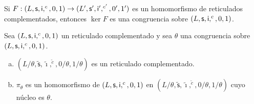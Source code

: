   \begin{lemma}
    \PN Si $F: (L, \mathsf{s}, \mathsf{i}, ^{c}, 0, 1) \rightarrow (L^{\prime}, \mathsf{s}^{\prime}, \mathsf{i}^{\prime}, ^{c^{\prime}}, 0^{\prime},
    1^{\prime})$ es un homomorfismo de reticulados complementados, entonces $\ker F$ es una congruencia sobre $(L, \mathsf{s},
    \mathsf{i}, ^{c}, 0, 1)$.
  \end{lemma}

  \begin{lemma}
    \PN Sea $(L, \mathsf{s}, \mathsf{i}, ^{c}, 0, 1)$ un reticulado complementado y sea $\theta$ una congruencia sobre $(L, \mathsf{s}, \mathsf{i},
    ^{c}, 0, 1)$.
    \begin{enumerate}[a)]
      \item $(L/\theta, \mathsf{\tilde{s}}, \mathsf{\tilde{\imath}}, ^{\tilde{c}}, 0/\theta, 1/\theta)$ es un reticulado
        complementado.
      \item $\pi_{\theta}$ es un homomorfismo de $(L, \mathsf{s}, \mathsf{i}, ^{c}, 0, 1)$ en $(L/\theta, \mathsf{\tilde{s}},
      \mathsf{\tilde{\imath}}, ^{\tilde{c}}, 0/\theta, 1/\theta)$ cuyo núcleo es $\theta$.
    \end{enumerate}
  \end{lemma}


